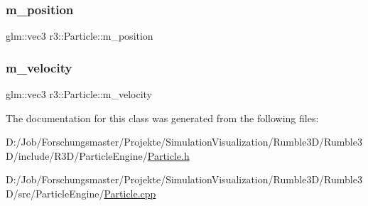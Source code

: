 \mbox{\label{classr3_1_1_particle_ab7f5aa7cf48278441aab18db1a0c1ba9}} 
\subsubsection{\texorpdfstring{m\+\_\+position}{m\_position}}
{\footnotesize\ttfamily glm\+::vec3 r3\+::\+Particle\+::m\+\_\+position\hspace{0.3cm}{\ttfamily [protected]}}

\mbox{\label{classr3_1_1_particle_a037d73e42df0c7bb9f1ae79b37301477}} 
\subsubsection{\texorpdfstring{m\+\_\+velocity}{m\_velocity}}
{\footnotesize\ttfamily glm\+::vec3 r3\+::\+Particle\+::m\+\_\+velocity\hspace{0.3cm}{\ttfamily [protected]}}



The documentation for this class was generated from the following files\+:\begin{DoxyCompactItemize}
\item 
D\+:/\+Job/\+Forschungsmaster/\+Projekte/\+Simulation\+Visualization/\+Rumble3\+D/\+Rumble3\+D/include/\+R3\+D/\+Particle\+Engine/\mbox{\hyperlink{_particle_8h}{Particle.\+h}}\item 
D\+:/\+Job/\+Forschungsmaster/\+Projekte/\+Simulation\+Visualization/\+Rumble3\+D/\+Rumble3\+D/src/\+Particle\+Engine/\mbox{\hyperlink{_particle_8cpp}{Particle.\+cpp}}\end{DoxyCompactItemize}
